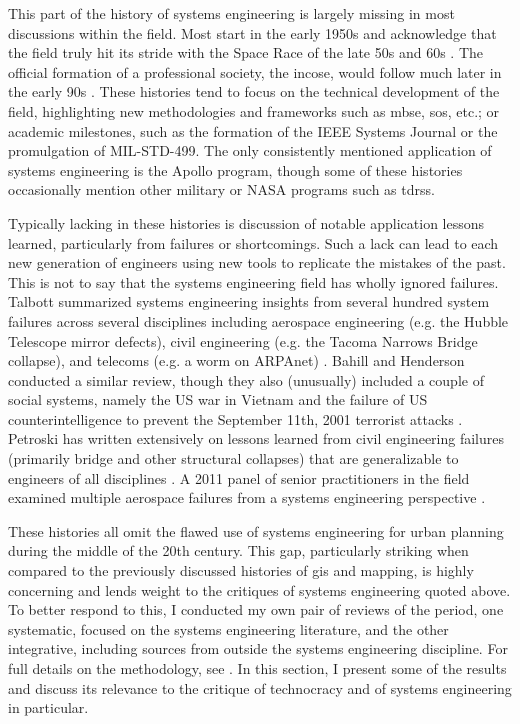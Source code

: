 This part of the history of systems engineering is largely missing in most discussions within the field. Most start in the early 1950s and acknowledge that the field truly hit its stride with the Space Race of the late 50s and 60s \cite{gorodSystemofSystemsEngineeringManagement2008, bootonDevelopmentSystemsEngineering1984, hallHallMethodologySystems1962, brillSystemsEngineeringRetrospective1998}. The official formation of a professional society, the \ac{incose}, would follow much later in the early 90s \cite{honourINCOSEHistoryInternational1998}. These histories tend to focus on the technical development of the field, highlighting new methodologies and frameworks such as \ac{mbse}, \ac{sos}, etc.; or academic milestones, such as the formation of the IEEE Systems Journal or the promulgation of MIL-STD-499. The only consistently mentioned application of systems engineering is the Apollo program, though some of these histories occasionally mention other military or NASA programs such as \ac{tdrss}.

Typically lacking in these histories is discussion of notable application lessons learned, particularly from failures or shortcomings. Such a lack can lead to each new generation of engineers using new tools to replicate the mistakes of the past. This is not to say that the systems engineering field has wholly ignored failures. Talbott summarized systems engineering insights from several hundred system failures across several disciplines including aerospace engineering (e.g. the Hubble Telescope mirror defects), civil engineering (e.g. the Tacoma Narrows Bridge collapse), and telecoms (e.g. a worm on ARPAnet) \cite{talbottWhySystemsFail1993}. Bahill and Henderson conducted a similar review, though they also (unusually) included a couple of social systems, namely the US war in Vietnam and the failure of US counterintelligence to prevent the September 11th, 2001 terrorist attacks \cite{terrybahillRequirementsDevelopmentVerification2005}. Petroski has written extensively on lessons learned from civil engineering failures (primarily bridge and other structural collapses) that are generalizable to engineers of all disciplines \cite{petroskiEngineerHumanRole1992, petroskiDesignParadigmsCase1994}. A 2011 panel of senior practitioners in the field examined multiple aerospace failures from a systems engineering perspective \cite{slegersLearningFailureSystems2012}. 

These histories all omit the flawed use of systems engineering for urban planning during the middle of the 20th century. This gap, particularly striking when compared to the previously discussed histories of \ac{gis} and mapping, is highly concerning and lends weight to the critiques of systems engineering quoted above. To better respond to this, I conducted my own pair of reviews of the period, one systematic, focused on the systems engineering literature, and the other integrative, including sources from outside the systems engineering discipline. For full details on the methodology, see  \cite{reidSystemsEngineeringAppliedPendingPublication}. In this section, I present some of the results and discuss its relevance to the critique of technocracy and of systems engineering in particular.

